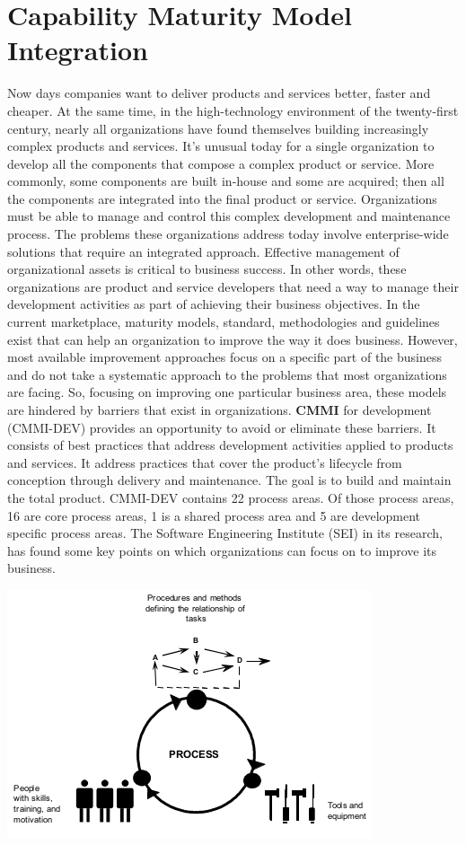 \section{Capability Maturity Model Integration}
Now days companies want to deliver products and services better, faster and cheaper. At the same
time, in the high-technology environment of the twenty-first century, nearly all organizations have found themselves building increasingly complex products and services. It's unusual today for a single organization to develop all the components that compose a complex product or service. More commonly, some components are built in-house and some are acquired; then all the components are integrated into the final product or service. Organizations must be able to manage and control this complex development and maintenance process. The problems these organizations address today involve enterprise-wide solutions that require an integrated approach. Effective management of organizational assets is critical to business success. In other words, these organizations are product and service developers that need a way to manage their development activities as part of achieving their business objectives. In the current marketplace, maturity models, standard, methodologies and guidelines exist that can help an organization to improve the way it does business. However, most available improvement approaches focus on a specific part of the business and do not take a systematic approach to the problems that most organizations are facing. So, focusing on improving one particular business area, these models are hindered by barriers that exist in organizations. \textbf{CMMI} for development (CMMI-DEV) provides an opportunity to avoid or eliminate these barriers. It consists of best practices that address development activities applied to products and services. It address practices that cover the product's lifecycle from conception through delivery and maintenance. The goal is to build and maintain the total product. CMMI-DEV contains 22 process areas. Of those process areas, 16 are core process areas, 1 is a shared process area and 5 are development specific process areas. The Software Engineering Institute (SEI) in its research, has found some key points on which organizations can focus on to improve its business.
\begin{center}
    \includegraphics[scale=0.40]{images/SEI_key_points.png}
\end{center}
